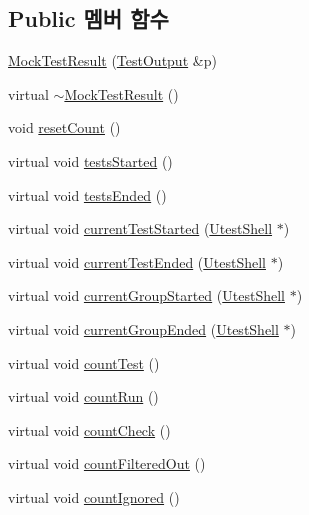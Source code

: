 \subsection*{Public 멤버 함수}
\begin{DoxyCompactItemize}
\item 
\hyperlink{class_mock_test_result_a94346f8f51f315ca77bb8ecc80bad1c0}{Mock\+Test\+Result} (\hyperlink{class_test_output}{Test\+Output} \&p)
\item 
virtual \hyperlink{class_mock_test_result_affeff7460808b892110bc85f7a1d6977}{$\sim$\+Mock\+Test\+Result} ()
\item 
void \hyperlink{class_mock_test_result_a533d6a62e6a72fded236dc2d757170d8}{reset\+Count} ()
\item 
virtual void \hyperlink{class_mock_test_result_a8d884e4508decbf909f3409a949af61e}{tests\+Started} ()
\item 
virtual void \hyperlink{class_mock_test_result_ab6f37d2118afa74473737e2dfa384448}{tests\+Ended} ()
\item 
virtual void \hyperlink{class_mock_test_result_aacbc9bcd3b123e00a91b5b56eedee281}{current\+Test\+Started} (\hyperlink{class_utest_shell}{Utest\+Shell} $\ast$)
\item 
virtual void \hyperlink{class_mock_test_result_a87e545137e81ecc086185844a8f0c08c}{current\+Test\+Ended} (\hyperlink{class_utest_shell}{Utest\+Shell} $\ast$)
\item 
virtual void \hyperlink{class_mock_test_result_a036425561f9578079ca5266821177fcb}{current\+Group\+Started} (\hyperlink{class_utest_shell}{Utest\+Shell} $\ast$)
\item 
virtual void \hyperlink{class_mock_test_result_a4876529940f7a22328b8ee135ec75c6b}{current\+Group\+Ended} (\hyperlink{class_utest_shell}{Utest\+Shell} $\ast$)
\item 
virtual void \hyperlink{class_test_result_a3ab54ad0444bf424ff50427e9f20a01c}{count\+Test} ()
\item 
virtual void \hyperlink{class_test_result_a988155e11cb6bc87d669b82832848511}{count\+Run} ()
\item 
virtual void \hyperlink{class_test_result_a58577489a2418efb4c440761e533f2e7}{count\+Check} ()
\item 
virtual void \hyperlink{class_test_result_ab01f644356c7b7487b7fc28cadfa8112}{count\+Filtered\+Out} ()
\item 
virtual void \hyperlink{class_test_result_ae64fc1e8e61088f7ebb45d4ddb9ebe8e}{count\+Ignored} ()
\item 

\end{DoxyCompactItemize}
